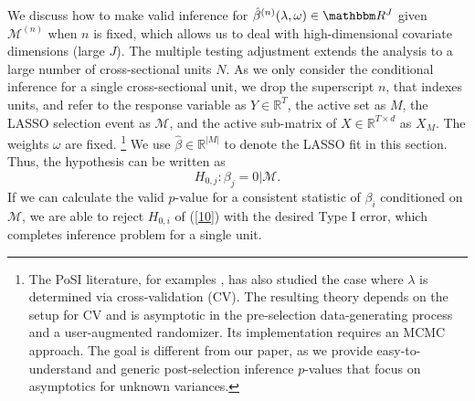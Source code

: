 \documentclass[11pt]{article}
\newcommand{\RR}{\mathbb{R}}
\begin{document}
	We discuss how to make valid inference for $\hat{\beta}^{(n)}(\lambda,\omega) \in \mathbbm R^J$ given $\mathcal{M}^{(n)}$ when $n$ is fixed, which allows us to deal with high-dimensional covariate dimensions (large $J$). The multiple testing adjustment extends the analysis to a large number of cross-sectional units $N$. %
	As we only consider the conditional inference for a single cross-sectional unit, we drop the superscript $n$, that indexes units, and refer to the response variable as $Y\in\RR^T$, the active set as $M$, the LASSO selection event as $\mathcal{M}$, and the active sub-matrix of $X\in\RR^{T\times d}$ as $X_M$. The weights $\omega$ are fixed. \footnote{The PoSI literature, for examples \cite{markovic2018unifying}, has also studied the case where $\lambda$ is determined via cross-validation (CV). The resulting theory depends on the setup for CV and is asymptotic in the pre-selection data-generating process and a user-augmented randomizer. Its implementation requires an MCMC approach. The goal is different from our paper, as we provide easy-to-understand and generic post-selection inference $p$-values that focus on asymptotics for unknown variances.} We use $\hat{\beta}\in\RR^{|M|}$ to denote the LASSO fit in this section. Thus, the hypothesis can be written as
	\begin{equation}\label{10}
		H_{0,j}:\beta_j=0|\mathcal{M}.
	\end{equation}
	If we can calculate the valid $p$-value for a consistent statistic of $\beta_i$ conditioned on $\mathcal{M}$, we are able to reject $H_{0,i}$ of (\ref{10}) with the desired Type I error, which completes inference problem for a single unit.
	
	
	
	
\end{document}
